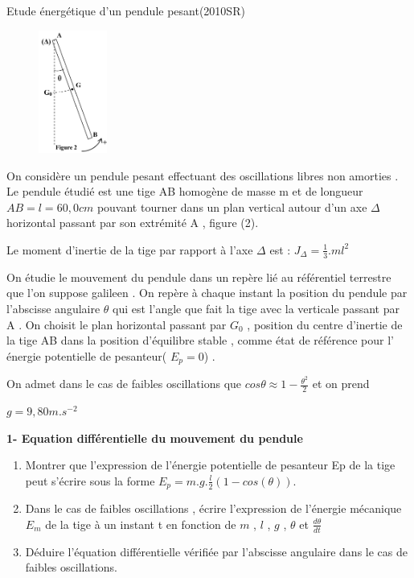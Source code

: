 \documentclass[12pt]{article}
\begin{document}
\begin{Box2}{Etude énergétique d’un pendule pesant(2010SR)}


	\begin{figure}
		\begin{center}
			\vspace{-0.8cm}
			\includegraphics[width=0.2\textwidth]{./img/penduleP00.png}
		\end{center}
	\end{figure}

On considère un pendule pesant effectuant des oscillations libres non amorties .
Le pendule étudié est une tige AB homogène de masse m et
de longueur $AB = l = 60,0 cm$ pouvant tourner dans un plan
vertical autour d’un axe $\Delta$ horizontal passant par son extrémité A ,
figure (2).

  Le moment d’inertie de la tige par rapport à l’axe $\Delta$ est : $J_{\Delta} = \frac{1}{3}.ml^2$

On étudie le mouvement du pendule dans un repère lié au référentiel terrestre
que l’on suppose galileen .
On repère à chaque instant la position du pendule par l’abscisse angulaire $\theta$
qui est l’angle que fait la tige avec la verticale passant par A .
On choisit le plan horizontal passant par $G_0$ , position du centre d’inertie de
la tige AB dans la position d’équilibre stable , comme état de référence
pour l’ énergie potentielle de pesanteur( $E_p = 0$) .

  On admet dans le cas de faibles oscillations que $cos\theta \approx 1 - \frac{\theta^2}{2}$
et on prend 

  $g = 9,80 m.s^{-2}$

  \textbf{1- Equation différentielle du mouvement du pendule}

  \begin{enumerate}
    \item Montrer que l’expression de l’énergie potentielle de pesanteur Ep de la tige peut s’écrire sous la
      forme $E_p = m.g.\frac{l}{2}(1 - cos(\theta))$.
    \item Dans le cas de faibles oscillations , écrire l’expression de l’énergie mécanique $E_m$ de la tige à un
instant t en fonction de $m$ , $l$ , $g$ , $\theta$ et $\frac{d\theta}{dt}$
\item Déduire l’équation différentielle vérifiée par l’abscisse angulaire dans le cas de faibles oscillations.
  \end{enumerate}


\end{Box2}
\end{document}
